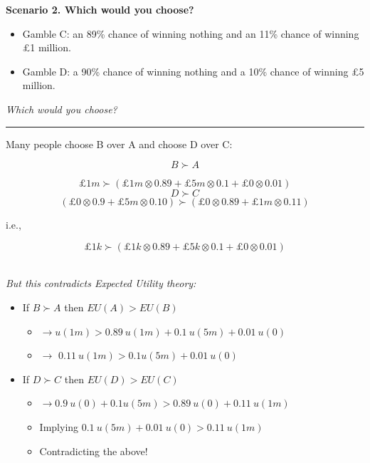 \documentclass[]{article}
\providecommand{\tightlist}{%
  \setlength{\itemsep}{0pt}\setlength{\parskip}{0pt}}
\begin{document}
\bigskip

\textbf{Scenario 2. Which would you choose?}

\begin{itemize}
\tightlist
\item
  Gamble C: an 89\% chance of winning nothing and an 11\% chance of winning \pounds 1 million.
\item
  Gamble D: a 90\% chance of winning nothing and a 10\% chance of winning \pounds5 million.
\end{itemize}

\bigskip

\emph{Which would you choose?}

\begin{center}\rule{0.5\linewidth}{\linethickness}\end{center}

Many people choose B over A and choose D over C:

\[B \succ A \]

\[ \pounds 1m \succ  (\pounds 1m \otimes 0.89 + \pounds 5m \otimes 0.1 + \pounds0 \otimes 0.01)\]
\[D \succ C \]
\[(\pounds 0 \otimes 0.9 +  \pounds 5m \otimes 0.10) \succ (\pounds 0 \otimes 0.89 + \pounds 1m \otimes 0.11) \]

i.e.,

\[ \pounds 1k \succ  (\pounds 1k \otimes 0.89 + \pounds 5k \otimes 0.1 + \pounds0 \otimes 0.01)\]\\

\bigskip

\emph{But this contradicts Expected Utility theory:}

\begin{itemize}
\tightlist
\item
  If \(B \succ A\) then \(EU(A) > EU(B)\)

  \begin{itemize}
  \tightlist
  \item
    \(\rightarrow u(1m) > 0.89 \: u(1m) + 0.1 \: u(5m) + 0.01 \: u(0)\)
  \item
    \(\rightarrow\) \(0.11 \: u(1m) > 0.1 u(5m) + 0.01 \: u(0)\)
  \end{itemize}
\item
  If \(D \succ C\) then \(EU(D)>EU(C)\)

  \begin{itemize}
  \tightlist
  \item
    \(\rightarrow 0.9 \: u(0) + 0.1 u(5m) > 0.89 \: u(0) + 0.11 \: u(1m)\)
  \item
    Implying \(0.1 \: u(5m) + 0.01 \: u(0) > 0.11 \: u(1m)\)
  \item
    Contradicting the above!
  \end{itemize}
\end{itemize}
\end{document}
